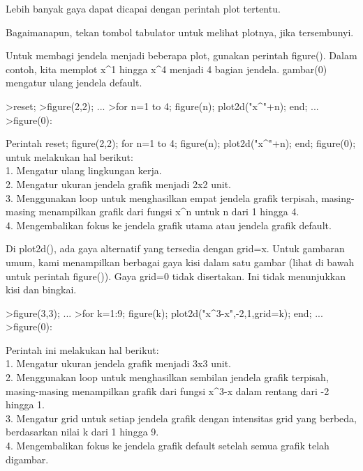 \documentclass{article}
\begin{document}
\begin{eulernotebook}
\begin{eulercomment}
\begin{eulercomment}
\begin{eulercomment}
\begin{eulercomment}
\begin{eulercomment}
Lebih banyak gaya dapat dicapai dengan perintah plot tertentu.

Bagaimanapun, tekan tombol tabulator untuk melihat plotnya, jika
tersembunyi.

Untuk membagi jendela menjadi beberapa plot, gunakan perintah
figure(). Dalam contoh, kita memplot x\textasciicircum{}1 hingga x\textasciicircum{}4 menjadi 4 bagian
jendela. gambar(0) mengatur ulang jendela default.
\end{eulercomment}
\begin{eulerprompt}
>reset;
>figure(2,2); ...
>for n=1 to 4; figure(n); plot2d("x^"+n); end; ...
>figure(0):
\end{eulerprompt}
\begin{eulercomment}
Perintah reset; figure(2,2); for n=1 to 4; figure(n); plot2d("x\textasciicircum{}"+n);
end; figure(0); untuk melakukan hal berikut:\\
1. Mengatur ulang lingkungan kerja.\\
2. Mengatur ukuran jendela grafik menjadi 2x2 unit.\\
3. Menggunakan loop untuk menghasilkan empat jendela grafik terpisah,
masing-masing menampilkan grafik dari fungsi x\textasciicircum{}n untuk n dari 1 hingga
4.\\
4. Mengembalikan fokus ke jendela grafik utama atau jendela grafik
default.

Di plot2d(), ada gaya alternatif yang tersedia dengan grid=x. Untuk
gambaran umum, kami menampilkan berbagai gaya kisi dalam satu gambar
(lihat di bawah untuk perintah figure()). Gaya grid=0 tidak
disertakan. Ini tidak menunjukkan kisi dan bingkai.
\end{eulercomment}
\begin{eulerprompt}
>figure(3,3); ...
>for k=1:9; figure(k); plot2d("x^3-x",-2,1,grid=k); end; ...
>figure(0):
\end{eulerprompt}
\begin{eulercomment}
Perintah ini melakukan hal berikut:\\
1. Mengatur ukuran jendela grafik menjadi 3x3 unit.\\
2. Menggunakan loop untuk menghasilkan sembilan jendela grafik
terpisah, masing-masing menampilkan grafik dari fungsi x\textasciicircum{}3-x dalam
rentang dari -2 hingga 1.\\
3. Mengatur grid untuk setiap jendela grafik dengan intensitas grid
yang berbeda, berdasarkan nilai k dari 1 hingga 9.\\
4. Mengembalikan fokus ke jendela grafik default setelah semua grafik
telah digambar.


\end{eulercomment}
\end{eulercomment}
\end{eulercomment}
\end{eulercomment}
\end{eulercomment}
\end{eulernotebook}
\end{document}
